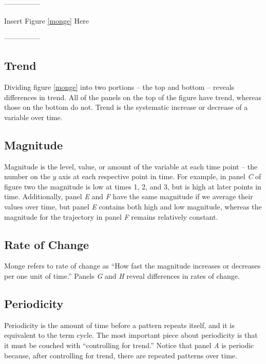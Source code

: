 \documentclass[english,,man]{apa6}
\theoremstyle{definition}
\theoremstyle{definition}
\theoremstyle{definition}
\theoremstyle{remark}
\begin{document}
\begin{center}

---------------

Insert Figure \ref{monge} Here

---------------

\end{center}

\hypertarget{trend}{%
\subsection{Trend}\label{trend}}

Dividing figure \ref{monge} into two portions -- the top and bottom --
reveals differences in trend. All of the panels on the top of the figure
have trend, whereas those on the bottom do not. Trend is the systematic
increase or decrease of a variable over time.

\hypertarget{magnitude}{%
\subsection{Magnitude}\label{magnitude}}

Magnitude is the level, value, or amount of the variable at each time
point -- the number on the \(y\) axis at each respective point in time.
For example, in panel \emph{C} of figure two the magnitude is low at
times 1, 2, and 3, but is high at later points in time. Additionally,
panel \emph{E} and \emph{F} have the same magnitude if we average their
values over time, but panel \emph{E} contains both high and low
magnitude, whereas the magnitude for the trajectory in panel \emph{F}
remains relatively constant.

\hypertarget{rate-of-change}{%
\subsection{Rate of Change}\label{rate-of-change}}

Monge refers to rate of change as \enquote{How fast the magnitude
increases or decreases per one unit of time.} Panels \emph{G} and
\emph{H} reveal differences in rates of change.

\hypertarget{periodicity}{%
\subsection{Periodicity}\label{periodicity}}

Periodicity is the amount of time before a pattern repeats itself, and
it is equivalent to the term cycle. The most important piece about
periodicity is that it must be couched with \enquote{controlling for
trend.} Notice that panel \emph{A} is periodic because, after
controlling for trend, there are repeated patterns over time.
\end{document}
